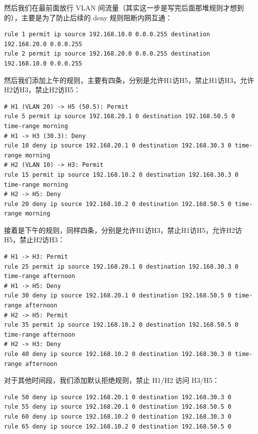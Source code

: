 \documentclass[a4paper]{article}
\begin{document}
然后我们在最前面放行 VLAN 间流量（其实这一步是写完后面那堆规则才想到的），主要是为了防止后续的 deny 规则阻断内网互通：

\begin{lstlisting}[language=HuaweiConfig, caption={VLAN 间互访规则}]
rule 1 permit ip source 192.168.10.0 0.0.0.255 destination 192.168.20.0 0.0.0.255
rule 2 permit ip source 192.168.20.0 0.0.0.255 destination 192.168.10.0 0.0.0.255
\end{lstlisting}

然后我们添加上午的规则，主要有四条，分别是允许H1访H5，禁止H1访H3，允许H2访H3，禁止H2访H5：

\begin{lstlisting}[language=HuaweiConfig, caption={上午规则}]
# H1 (VLAN 20) -> H5 (50.5): Permit
rule 5 permit ip source 192.168.20.1 0 destination 192.168.50.5 0 time-range morning
# H1 -> H3 (30.3): Deny
rule 10 deny ip source 192.168.20.1 0 destination 192.168.30.3 0 time-range morning
# H2 (VLAN 10) -> H3: Permit
rule 15 permit ip source 192.168.10.2 0 destination 192.168.30.3 0 time-range morning
# H2 -> H5: Deny
rule 20 deny ip source 192.168.10.2 0 destination 192.168.50.5 0 time-range morning
\end{lstlisting}

接着是下午的规则，同样四条，分别是允许H1访H3，禁止H1访H5，允许H2访H5，禁止H2访H3：

\begin{lstlisting}[language=HuaweiConfig, caption={下午规则}]
# H1 -> H3: Permit
rule 25 permit ip source 192.168.20.1 0 destination 192.168.30.3 0 time-range afternoon
# H1 -> H5: Deny
rule 30 deny ip source 192.168.20.1 0 destination 192.168.50.5 0 time-range afternoon
# H2 -> H5: Permit
rule 35 permit ip source 192.168.10.2 0 destination 192.168.50.5 0 time-range afternoon
# H2 -> H3: Deny
rule 40 deny ip source 192.168.10.2 0 destination 192.168.30.3 0 time-range afternoon
\end{lstlisting}

对于其他时间段，我们添加默认拒绝规则，禁止 H1/H2 访问 H3/H5：

\begin{lstlisting}[language=HuaweiConfig, caption={其他时间段默认拒绝规则}]
rule 50 deny ip source 192.168.20.1 0 destination 192.168.30.3 0
rule 55 deny ip source 192.168.20.1 0 destination 192.168.50.5 0
rule 60 deny ip source 192.168.10.2 0 destination 192.168.30.3 0
rule 65 deny ip source 192.168.10.2 0 destination 192.168.50.5 0
\end{lstlisting}
\end{document}
